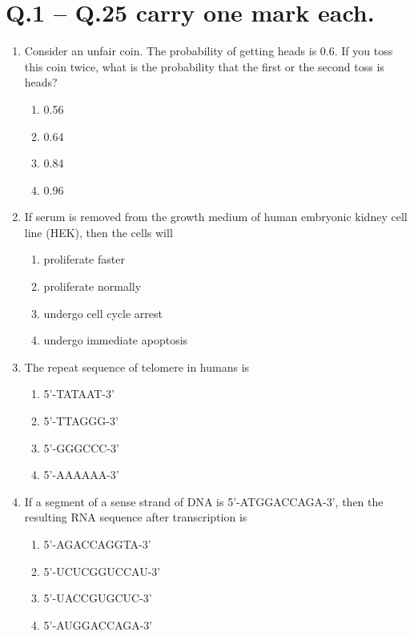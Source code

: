 \documentclass[journal,12pt,onecolumn]{IEEEtran}
\theoremstyle{remark}
\begin{document}
    \section*{Q.1 -- Q.25 carry one mark each.}

\begin{enumerate}
    \item Consider an unfair coin. The probability of getting heads is $0.6$. If you toss this coin twice, what is the probability that the first or the second toss is heads?
    \begin{multicols}{4}
    \begin{enumerate}
        \item 0.56
        \item 0.64
        \item 0.84
        \item 0.96
    \end{enumerate}
    \end{multicols}
    
    \item If serum is removed from the growth medium of human embryonic kidney cell line (HEK), then the cells will
    
    \begin{enumerate}
        \item proliferate faster
        \item proliferate normally
        \item undergo cell cycle arrest
        \item undergo immediate apoptosis
    \end{enumerate}
   

    \item The repeat sequence of telomere in humans is
    \begin{multicols}{2}
    \begin{enumerate}
        \item 5'-TATAAT-3'
        \item 5'-TTAGGG-3'
        \item 5'-GGGCCC-3'
        \item 5'-AAAAAA-3'
    \end{enumerate}
    \end{multicols}

    \item If a segment of a sense strand of DNA is 5'-ATGGACCAGA-3', then the resulting RNA sequence after transcription is
    \begin{multicols}{2}
    \begin{enumerate}
        \item 5'-AGACCAGGTA-3'
        \item 5'-UCUCGGUCCAU-3'
        \item 5'-UACCGUGCUC-3'
        \item 5'-AUGGACCAGA-3'
    \end{enumerate}
    \end{multicols}
    

\end{enumerate}
\end{document}
